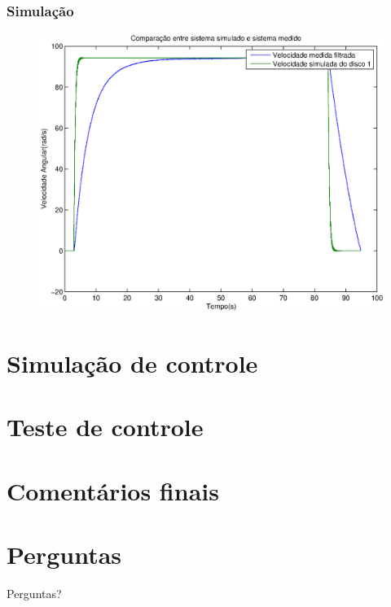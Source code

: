 \documentclass{beamer}
\begin{document}
\begin{frame}
\frametitle{Simulação}
\begin{figure}
	\centering
	\includegraphics[width=0.7\linewidth]{simv}
\end{figure}
\end{frame}

\section{Simulação de controle}
\section{Teste de controle}
\section{Comentários finais}
\section{Perguntas}
\begin{frame}
\Huge{\centerline{Perguntas?}}
\end{frame}

\end{document}
